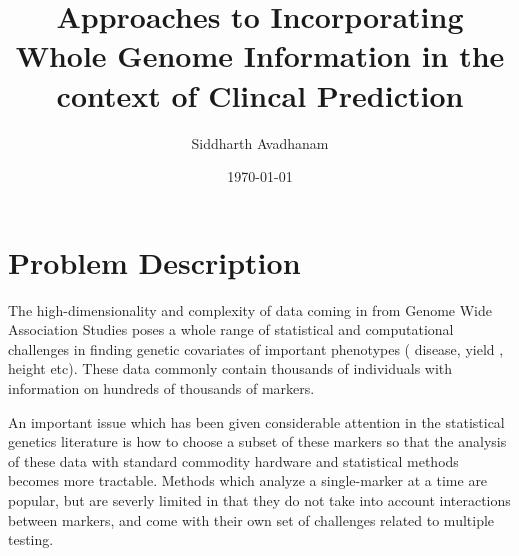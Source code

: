 \documentclass{sig-alternate-05-2015}
\begin{document}

\title{Approaches to Incorporating Whole Genome Information in the context of Clincal Prediction}

\author{
%
%
Siddharth Avadhanam\\
}
\date{\today}

\maketitle



\section{Problem Description}

The high-dimensionality and complexity of data coming in from Genome Wide Association Studies
poses a whole range of statistical and computational challenges in finding genetic covariates of important phenotypes
( disease, yield , height etc). These data commonly contain thousands of individuals with information on
hundreds of thousands of markers. \cite{zhang_chapter_2012}

An important issue which has been given considerable attention in the statistical genetics
literature is how to choose a subset of these markers so that the analysis of these data with standard commodity hardware and statistical methods
becomes more tractable.\cite{de_los_campos_whole-genome_2013} Methods which analyze a single-marker at a time are popular, but are severly limited in that they do not take into account
interactions between markers, and come with their own set of challenges related to multiple testing.\cite{moskvina_multiple-testing_2008}
\end{document}

